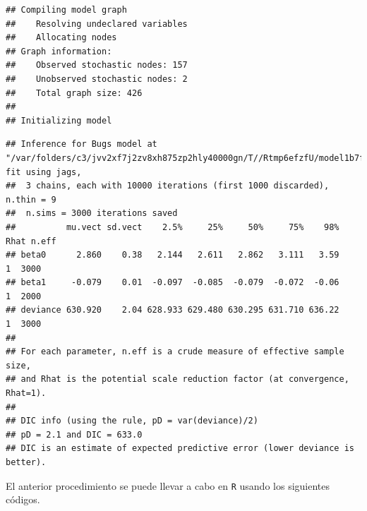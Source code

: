 \begin{Eje}
\begin{knitrout}
\begin{kframe}
{\ttfamily\noindent\itshape\color{messagecolor}{\#\# module glm loaded}}\begin{verbatim}
## Compiling model graph
##    Resolving undeclared variables
##    Allocating nodes
## Graph information:
##    Observed stochastic nodes: 157
##    Unobserved stochastic nodes: 2
##    Total graph size: 426
## 
## Initializing model
\end{verbatim}
\begin{alltt}
\end{alltt}
\begin{verbatim}
## Inference for Bugs model at "/var/folders/c3/jvv2xf7j2zv8xh875zp2hly40000gn/T//Rtmp6efzfU/model1b7f7b8c3e8e.txt", fit using jags,
##  3 chains, each with 10000 iterations (first 1000 discarded), n.thin = 9
##  n.sims = 3000 iterations saved
##          mu.vect sd.vect    2.5%     25%     50%     75%    98% Rhat n.eff
## beta0      2.860    0.38   2.144   2.611   2.862   3.111   3.59    1  3000
## beta1     -0.079    0.01  -0.097  -0.085  -0.079  -0.072  -0.06    1  2000
## deviance 630.920    2.04 628.933 629.480 630.295 631.710 636.22    1  3000
## 
## For each parameter, n.eff is a crude measure of effective sample size,
## and Rhat is the potential scale reduction factor (at convergence, Rhat=1).
## 
## DIC info (using the rule, pD = var(deviance)/2)
## pD = 2.1 and DIC = 633.0
## DIC is an estimate of expected predictive error (lower deviance is better).
\end{verbatim}
\end{kframe}
\end{knitrout}
El anterior procedimiento se puede llevar a cabo en \verb'R' usando los siguientes códigos. 


\end{Eje}
